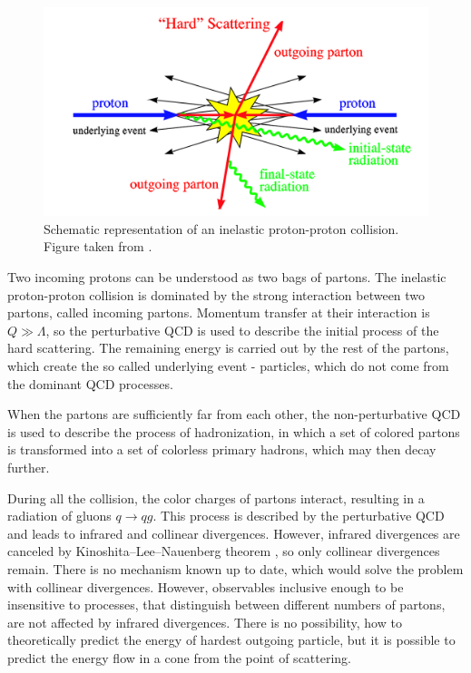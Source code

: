 \begin{figure}[t]
  \centering
  \includegraphics[width=\textwidth]{Chapter2/HardProcess.png}
  \caption[Schematic representation of an inelastic proton-proton
          collision.]
          {Schematic representation of an inelastic proton-proton
          collision. Figure taken from \cite{HardProcess}.}
  \label{fig:HardProcess}
\end{figure}

Two incoming protons can be understood as two bags of partons. 
The inelastic proton-proton collision is dominated by the strong interaction
between two partons, called incoming partons. 
Momentum transfer at their interaction is $Q \gg \Lambda$, so the perturbative
QCD is used to describe the initial process of the hard scattering. 
The remaining energy is carried out by the rest of the partons, which create the so
called underlying event - particles, which do not come from the dominant QCD
processes.

When the partons are sufficiently far from each other, the non-perturbative QCD is
used to describe the process of hadronization, in which a set of colored
partons is transformed into a set of colorless primary hadrons, which may then
decay further. 

During all the collision, the color charges of partons interact, resulting in a
radiation of gluons $q \rightarrow qg$. This process is described by the
perturbative QCD and leads to infrared and collinear divergences. However,
infrared divergences are
canceled by Kinoshita--Lee--Nauenberg theorem \cite{KLN1,KLN2}, so only
collinear divergences remain. There is no mechanism known up to date, which
would solve the problem with collinear divergences. However, observables
inclusive enough to be insensitive to processes, that distinguish between
different numbers of partons, are not affected by infrared divergences.
There is no possibility, how to theoretically predict the energy of hardest
outgoing particle, but it is possible to predict the energy flow in a cone from
the point of scattering.

